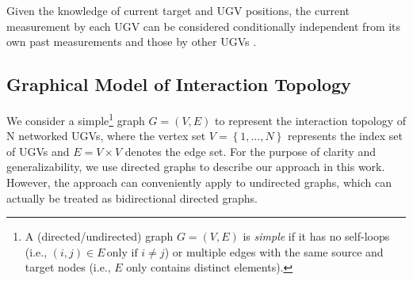 	
	\begin{rem}
		Given the knowledge of current target and UGV positions, the current measurement by each UGV can be considered conditionally independent from its own past measurements and those by other UGVs \cite{bourgault2003optimal}.
	\end{rem}
	
	
	\subsection{Graphical Model of Interaction Topology}
	We consider a simple\footnote{A (directed/undirected) graph $G=(V,E)$ is \textit{simple} if it has no self-loops (i.e., $\left( i,j\right)\in E\,\text{only if } i\neq j$) or multiple edges with the same source and target nodes (i.e., $E$ only contains distinct elements).} graph $G=(V,E)$ to represent the interaction topology of N networked UGVs, where the vertex set $V=\left\lbrace 1,\dots,N\right\rbrace $ represents the index set of UGVs and $E=V\times V$ denotes the edge set. 
	For the purpose of clarity and generalizability, we use directed graphs to describe our approach in this work.
	However, the approach can conveniently apply to undirected graphs, which can actually be treated as bidirectional directed graphs.
	
